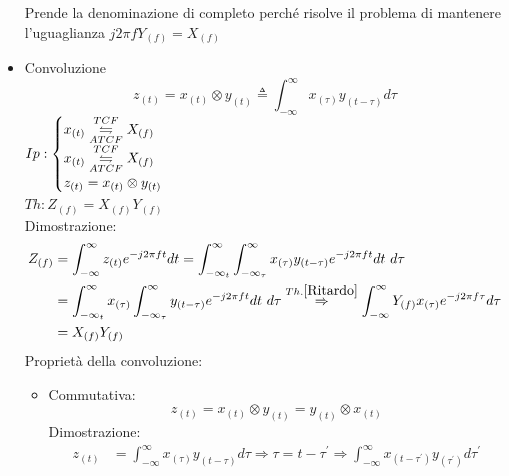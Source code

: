 \begin{itemize}
{                    Prende la denominazione di completo perché risolve il problema di mantenere l'uguaglianza $j2\pi fY_{(f)} = X_{(f)}$
                    
                }
                \item{Convoluzione\\
                    \[
                        z_{(t)} = x_{(t)} \otimes  y_{(t)} \triangleq \int_{-\infty}^{\infty} x_{(\tau)}y_{(t-\tau)} d\tau
                    \] 
                    $Ip:\begin{cases}
                        x_{(t)}\overunderset{TCF}{ATCF}{\leftrightharpoons} X_{(f)} \\
                        x_{(t)}\overunderset{TCF}{ATCF}{\leftrightharpoons} X_{(f)} \\
                        z_{(t)} = x_{(t)} \otimes  y_{(t)}   
                    \end{cases}$\\
                    $Th: Z_{(f)} = X_{(f)}Y_{(f)} $ \\
                    Dimostrazione:
                        \begin{align}
                            Z_{(f)} &= \int_{-\infty}^{\infty} z_{(t)} e^{-j2\pi ft} dt = \int_{-\infty_{t}}^{\infty}\int_{-\infty_{\tau}}^{\infty} x_{(\tau)}y_{(t-\tau)} e^{-j2\pi ft} dt\ d\tau \nonumber \\
                                    &= \int_{-\infty_{t}}^{\infty}x_{(\tau)}\int_{-\infty_{\tau}}^{\infty} y_{(t-\tau)}e^{-j2\pi ft}  dt\ d\tau \overset{Th. \ref{Ritardo}}{\Rightarrow} \int_{-\infty}^{\infty}Y_{(f)}x_{(\tau)}e^{-j2\pi f\tau} d\tau  \nonumber \\
                                    &= X_{(f)}Y_{(f)} \nonumber
                        \end{align}
                    Proprietà della convoluzione:
                    \begin{itemize}
                        \item {
                                Commutativa:
                                \[
                                    z_{(t)} = x_{(t)} \otimes  y_{(t)} = y_{(t)} \otimes  x_{(t)}  
                                \]
                                Dimostrazione:
                                \begin{align}
                                    z_{(t)} &= \int_{-\infty}^{\infty} x_{(\tau)}y_{(t-\tau)} d\tau \Rightarrow \tau=t-\tau^\prime\Rightarrow \int_{-\infty}^{\infty} x_{(t-\tau^\prime)}y_{(\tau^\prime)} d\tau^\prime \nonumber \\

\end{align}}
\end{itemize}}
\end{itemize}
